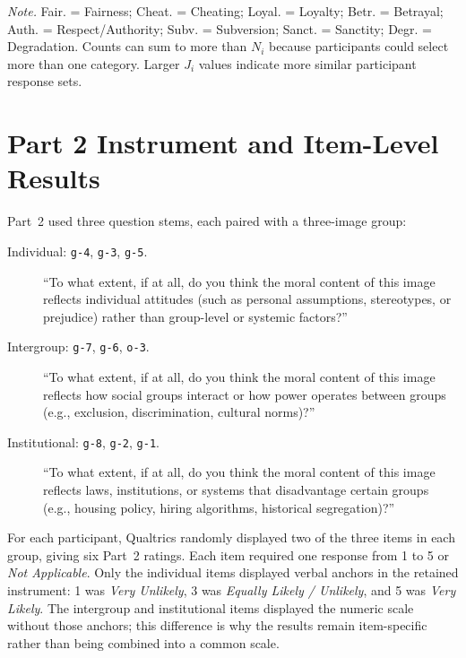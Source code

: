 \begin{table}[p]
    \vspace{2mm}
    \parbox{0.94\linewidth}{\footnotesize
    \textit{Note.} Fair. = Fairness; Cheat. = Cheating; Loyal. = Loyalty;
    Betr. = Betrayal; Auth. = Respect/Authority; Subv. = Subversion;
    Sanct. = Sanctity; Degr. = Degradation. Counts can sum to more than
    \(N_i\) because participants could select more than one category. Larger
    \(J_i\) values indicate more similar participant response sets.}
\end{table}

\FloatBarrier
\clearpage
\justifying
\section{Part 2 Instrument and Item-Level Results}
\label{app:part2_results}

Part~2 used three question stems, each paired with a three-image group:

\begin{description}
    \item[Individual: \texttt{g-4}, \texttt{g-3}, \texttt{g-5}.]
    ``To what extent, if at all, do you think the moral content of this image
    reflects individual attitudes (such as personal assumptions, stereotypes,
    or prejudice) rather than group-level or systemic factors?''

    \item[Intergroup: \texttt{g-7}, \texttt{g-6}, \texttt{o-3}.]
    ``To what extent, if at all, do you think the moral content of this image
    reflects how social groups interact or how power operates between groups
    (e.g., exclusion, discrimination, cultural norms)?''

    \item[Institutional: \texttt{g-8}, \texttt{g-2}, \texttt{g-1}.]
    ``To what extent, if at all, do you think the moral content of this image
    reflects laws, institutions, or systems that disadvantage certain groups
    (e.g., housing policy, hiring algorithms, historical segregation)?''
\end{description}

For each participant, Qualtrics randomly displayed two of the three items in
each group, giving six Part~2 ratings. Each item required one response from 1
to 5 or \textit{Not Applicable}. Only the individual items displayed verbal
anchors in the retained instrument: 1 was \textit{Very Unlikely}, 3 was
\textit{Equally Likely / Unlikely}, and 5 was \textit{Very Likely}. The
intergroup and institutional items displayed the numeric scale without those
anchors; this difference is why the results remain item-specific rather than
being combined into a common scale.

